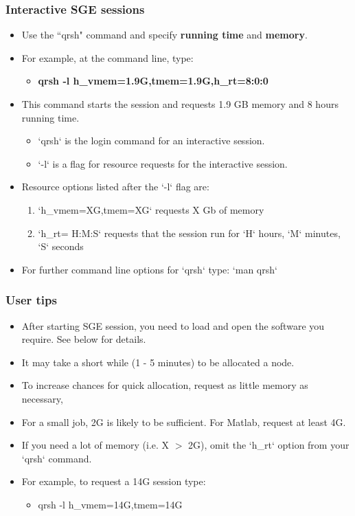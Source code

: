 \documentclass{beamer}
\begin{document}
\begin{frame}
\frametitle{Interactive SGE sessions}

\begin{itemize}
\item Use the ``qrsh" command and specify \textbf{running time} and \textbf{memory}.
\item For example, at the command line, type:
\begin{itemize}
\item \textbf{qrsh -l h\_vmem=1.9G,tmem=1.9G,h\_rt=8:0:0}
\end{itemize}
\item This command starts the session and requests 1.9 GB memory and 8 hours running time.
\begin{itemize}
\item `qrsh` is the login command for an interactive session.
\item `-l` is a flag for resource requests for the interactive session.
\end{itemize}
\item Resource options listed after the `-l` flag are:
\begin{enumerate}
\item `h\_vmem=XG,tmem=XG` requests X Gb of memory 
\item `h\_rt= H:M:S` requests that the session run for `H` hours, `M` minutes, `S` seconds
\end{enumerate}
\item For further command line options for `qrsh` type: `man qrsh`
\end{itemize}
\end{frame}

\begin{frame}
\frametitle{User tips}
\begin{itemize}
\item After starting SGE session, you need to load and open the software you require. See below for details.
\item It may take a short while (1 - 5 minutes) to be allocated a node.
\item To increase chances for quick allocation, request as little memory as necessary,
\item For a small job, 2G is likely to be sufficient. For Matlab, request at least 4G. 
\item If you need a lot of memory (i.e. X $>$ 2G), omit the `h\_rt` option from your `qrsh` command. 
\item For example, to request a 14G session type:
\begin{itemize}
\item qrsh -l h\_vmem=14G,tmem=14G
\end{itemize}
\end{itemize}

\end{frame}
\end{document}
